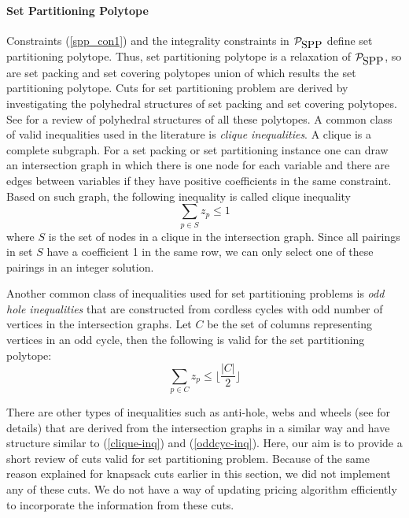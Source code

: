 \paragraph{Set Partitioning Polytope} Constraints (\ref{spp_con1})
and the integrality constraints in $\mathcal{P}_{\mbox{SPP}}$  define set partitioning
polytope. Thus, set partitioning polytope is a relaxation of
$\mathcal{P}_{\mbox{SPP}}$, so are set packing and set covering polytopes union of
which results the set partitioning polytope. Cuts for set partitioning
problem are derived by investigating the polyhedral structures of
set packing and set covering polytopes. See \citet{Balas76} for a
review of polyhedral structures of all these polytopes. A common
class of valid inequalities used in the literature is {\em clique
inequalities}. A clique is a complete subgraph. For a set packing or
set partitioning instance one can draw an intersection graph in
which there is one node for each variable and there are edges
between variables if they have positive coefficients in the same
constraint. Based on such graph, the following inequality is called
clique inequality
\begin{equation}
\sum_{p \in S}z_{p} \leq 1 \label{clique-inq}
\end{equation}
where $S$ is the set of nodes in a clique in the intersection graph. Since
all pairings in set $S$ have a coefficient 1 in the same row, we can
only select one of these pairings in an integer solution.

Another common class of inequalities used for set partitioning problems is
{\em odd hole inequalities} that are constructed from cordless cycles with odd
number of vertices in the intersection graphs. Let $C$ be the set of
columns representing vertices in an odd cycle, then the following is valid
for the set partitioning polytope:
\begin{equation}
\sum_{p \in C}z_{p} \leq \Big\lfloor \frac{|C|}{2} \Big\rfloor \label{oddcyc-inq}
\end{equation}

There are other types of inequalities such as anti-hole, webs and
wheels (see \citet{Eso} for details) that are derived from the
intersection graphs in a similar way and have  structure similar
to (\ref{clique-inq}) and (\ref{oddcyc-inq}).
Here, our aim is to provide a short review of cuts valid for set
partitioning problem. Because of the same reason explained for
knapsack cuts earlier in this section, we did not implement any of
these cuts. We do not have a way of updating pricing algorithm
efficiently to incorporate the information from these cuts.

